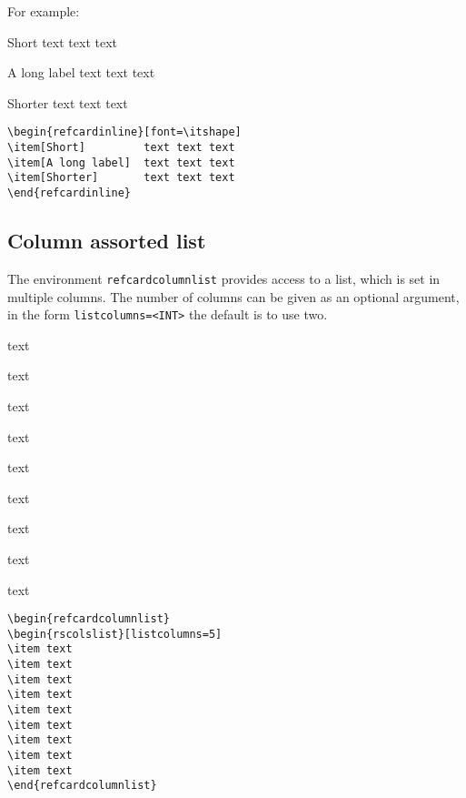 \documentclass[   %
  final,          %
  a4paper,        %
  columns=3,       %
  margin=1.0cm,   %
]{refcard}
\begin{document}
For example: 
\begin{refcardinline}[font=\itshape]
\item[Short]         text text text 
\item[A long label]  text text text 
\item[Shorter]       text text text 
\end{refcardinline}

\begin{lstlisting}
\begin{refcardinline}[font=\itshape]
\item[Short]         text text text 
\item[A long label]  text text text 
\item[Shorter]       text text text 
\end{refcardinline}
\end{lstlisting}

\subsection{Column assorted list}

The environment \lstinline`refcardcolumnlist` provides access to a list, 
which is set in multiple columns.
The number of columns can be given as an optional argument,
in the form \lstinline`listcolumns=<INT>`
the default is to use two.

\begin{refcardcolumnlist}[listcolumns=5]
\item text
\item text
\item text
\item text
\item text
\item text
\item text
\item text
\item text
\end{refcardcolumnlist}

\begin{lstlisting}
\begin{refcardcolumnlist}
\begin{rscolslist}[listcolumns=5]
\item text
\item text
\item text
\item text
\item text
\item text
\item text
\item text
\item text
\end{refcardcolumnlist}
\end{lstlisting}
\end{document}
